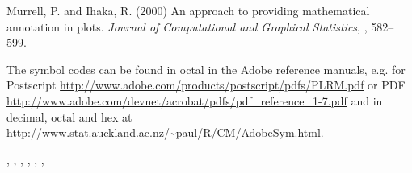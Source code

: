 %
\begin{References}\relax
Murrell, P. and Ihaka, R. (2000) An approach to providing
mathematical annotation in plots.
\emph{Journal of Computational and Graphical Statistics},
, 582--599.

The symbol codes can be found in octal in the Adobe reference manuals,
e.g. for Postscript
\url{http://www.adobe.com/products/postscript/pdfs/PLRM.pdf}
or PDF
\url{http://www.adobe.com/devnet/acrobat/pdfs/pdf_reference_1-7.pdf}
and in decimal, octal and hex at
\url{http://www.stat.auckland.ac.nz/~paul/R/CM/AdobeSym.html}.
\end{References}
%
\begin{SeeAlso}\relax
{},
,
,
,
,
, 
\end{SeeAlso}
%
